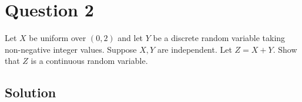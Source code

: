 \section*{Question 2}

Let \( X \) be uniform over \( (0,2) \) and let \( Y \) be a discrete random variable taking non-negative integer values.
Suppose \( X, Y \) are independent.
Let \( Z=X+Y \).
Show that \( Z \) is a continuous random variable.

\subsection*{Solution}
